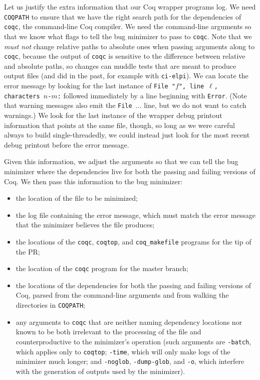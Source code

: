 \documentclass[a4paper,USenglish,cleveref,autoref,thm-restate,pdfa]{lipics-v2021}
\begin{document}
Let us justify the extra information that our Coq wrapper programs log.
We need \texttt{COQPATH} to ensure that we have the right search path for the dependencies of \texttt{coqc}, the command-line Coq compiler.
We need the command-line arguments so that we know what flags to tell the bug minimizer to pass to \texttt{coqc}.
Note that we \emph{must not} change relative paths to absolute ones when passing arguments along to \texttt{coqc}, because the output of \texttt{coqc} is sensitive to the difference between relative and absolute paths, so changes can muddle tests that are meant to produce output files (and did in the past, for example with \texttt{ci-elpi}).
We can locate the error message by looking for the last instance of \texttt{File "$f$", line $\ell$, characters $n$-$m$:} followed immediately by a line beginning with \texttt{Error}.
(Note that warning messages also emit the \texttt{File $\ldots$} line, but we do not want to catch warnings.)
We look for the last instance of the wrapper debug printout information that points at the same file, though, so long as we were careful always to build single-threadedly, we could instead just look for the most recent debug printout before the error message.

Given this information, we adjust the arguments so that we can tell the bug minimizer where the dependencies live for both the passing and failing versions of Coq.
We then pass this information to the bug minimizer:
\begin{itemize}
\item the location of the file to be minimized;
\item the log file containing the error message, which must match the error message that the minimizer believes the file produces;
\item the locations of the \verb|coqc|, \verb|coqtop|, and \verb|coq_makefile| programs for the tip of the PR;
\item the location of the \verb|coqc| program for the master branch;
\item the locations of the dependencies for both the passing and failing versions of Coq, parsed from the command-line arguments and from walking the directories in \texttt{COQPATH};
\item any arguments to \verb|coqc| that are neither naming dependency locations nor known to be both irrelevant to the processing of the file and counterproductive to the minimizer's operation (such arguments are \verb|-batch|, which applies only to \verb|coqtop|; \verb|-time|, which will only make logs of the minimizer much longer; and \verb|-noglob|, \verb|-dump-glob|, and \verb|-o|, which interfere with the generation of outputs used by the minimizer).
\end{itemize}
\end{document}

